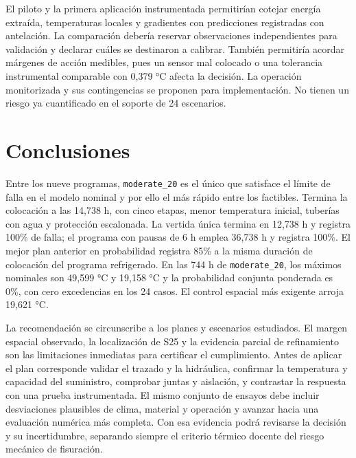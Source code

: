 \documentclass[11pt,a4paper]{article}
\newcommand{\plan}[1]{\texttt{#1}}
\begin{document}
El piloto y la primera aplicación instrumentada permitirían cotejar energía extraída, temperaturas locales y gradientes con predicciones registradas con antelación. La comparación debería reservar observaciones independientes para validación y declarar cuáles se destinaron a calibrar. También permitiría acordar márgenes de acción medibles, pues un sensor mal colocado o una tolerancia instrumental comparable con 0,379 °C afecta la decisión. La operación monitorizada y sus contingencias se proponen para implementación. No tienen un riesgo ya cuantificado en el soporte de 24 escenarios.

\section{Conclusiones}
Entre los nueve programas, \plan{moderate\_20} es el único que satisface el límite de falla en el modelo nominal y por ello el más rápido entre los factibles. Termina la colocación a las 14,738 h, con cinco etapas, menor temperatura inicial, tuberías con agua y protección escalonada. La vertida única termina en 12,738 h y registra 100\% de falla; el programa con pausas de 6 h emplea 36,738 h y registra 100\%. El mejor plan anterior en probabilidad registra 85\% a la misma duración de colocación del programa refrigerado. En las 744 h de \plan{moderate\_20}, los máximos nominales son 49,599 °C y 19,158 °C y la probabilidad conjunta ponderada es 0\%, con cero excedencias en los 24 casos. El control espacial más exigente arroja 19,621 °C.

La recomendación se circunscribe a los planes y escenarios estudiados. El margen espacial observado, la localización de S25 y la evidencia parcial de refinamiento son las limitaciones inmediatas para certificar el cumplimiento. Antes de aplicar el plan corresponde validar el trazado y la hidráulica, confirmar la temperatura y capacidad del suministro, comprobar juntas y aislación, y contrastar la respuesta con una prueba instrumentada. El mismo conjunto de ensayos debe incluir desviaciones plausibles de clima, material y operación y avanzar hacia una evaluación numérica más completa. Con esa evidencia podrá revisarse la decisión y su incertidumbre, separando siempre el criterio térmico docente del riesgo mecánico de fisuración.
\end{document}
